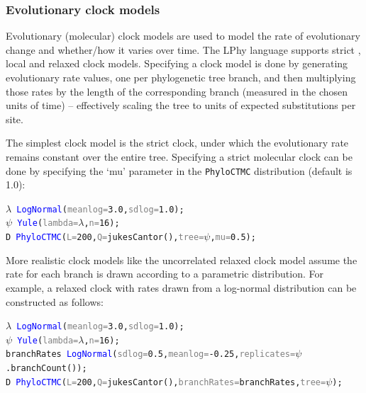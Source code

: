 \documentclass[10pt,letterpaper,table]{article}
\begin{document}
\subsubsection{Evolutionary clock models}
\label{sec:clockmodels}

Evolutionary (molecular) clock models are used to model the rate of evolutionary change and whether/how it varies over time. The LPhy language supports strict \cite{zuckerkandl1965evolutionary, zuckerkandl1965molecules}, local \cite{drummond2010bayesian} and relaxed clock \cite{drummond2006relaxedconfidence} models. 
Specifying a clock model is done by generating evolutionary rate values, one per phylogenetic tree branch, and then multiplying those rates by the length of the corresponding branch (measured in the chosen units of time) -- effectively scaling the tree to units of expected substitutions per site. 

The simplest clock model is the strict clock, under which the evolutionary rate remains constant over the entire tree. Specifying a strict molecular clock can be done by specifying the `mu' parameter in the \texttt{PhyloCTMC} distribution (default is 1.0):
{\small
\begin{alltt}
    \textcolor{bluishgreen}{\(\lambda\)} ~ \textcolor{blue}{LogNormal}(\textcolor{gray}{meanlog=}\textcolor{constant}{3.0}, \textcolor{gray}{sdlog=}\textcolor{constant}{1.0});
    \textcolor{bluishgreen}{\(\psi\)} ~ \textcolor{blue}{Yule}(\textcolor{gray}{lambda=}\textcolor{bluishgreen}{\(\lambda\)}, \textcolor{gray}{n=}\textcolor{constant}{16});
    \textcolor{bluishgreen}{D} ~ \textcolor{blue}{PhyloCTMC}(\textcolor{gray}{L=}\textcolor{constant}{200}, \textcolor{gray}{Q=}\textcolor{generator}{jukesCantor}(), \textcolor{gray}{tree=}\textcolor{bluishgreen}{\(\psi\)}, \textcolor{gray}{mu=}\textcolor{constant}{0.5});
\end{alltt}
}
More realistic clock models like the uncorrelated relaxed clock model \cite{drummond2006relaxedconfidence} assume the rate for each branch is drawn according to a parametric distribution. For example, a relaxed clock with rates drawn from a log-normal distribution can be constructed as follows:

{
\small
\begin{alltt}
  \textcolor{bluishgreen}{\(\lambda\)} ~ \textcolor{blue}{LogNormal}(\textcolor{gray}{meanlog=}\textcolor{constant}{3.0}, \textcolor{gray}{sdlog=}\textcolor{constant}{1.0});
  \textcolor{bluishgreen}{\(\psi\)} ~ \textcolor{blue}{Yule}(\textcolor{gray}{lambda=}\textcolor{bluishgreen}{\(\lambda\)}, \textcolor{gray}{n=}\textcolor{constant}{16});
  \textcolor{bluishgreen}{branchRates} ~ \textcolor{blue}{LogNormal}(\textcolor{gray}{sdlog=}\textcolor{constant}{0.5}, \textcolor{gray}{meanlog=}\textcolor{constant}{-0.25}, \textcolor{gray}{replicates=}\textcolor{bluishgreen}{\(\psi\)}.\textcolor{generator}{branchCount}());
  \textcolor{bluishgreen}{D} ~ \textcolor{blue}{PhyloCTMC}(\textcolor{gray}{L=}\textcolor{constant}{200}, \textcolor{gray}{Q=}\textcolor{generator}{jukesCantor}(), \textcolor{gray}{branchRates=}\textcolor{bluishgreen}{branchRates}, \textcolor{gray}{tree=}\textcolor{bluishgreen}{\(\psi\)});
\end{alltt}
}
\end{document}
